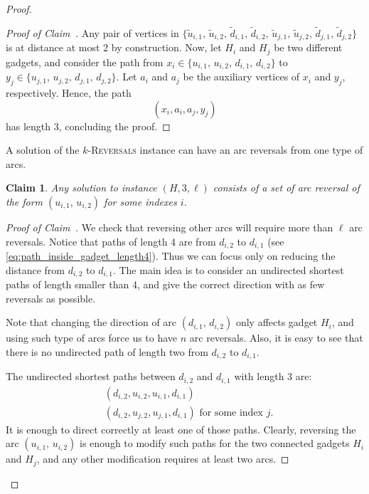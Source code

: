 \documentclass[11pt, twoside]{article}
\numberwithin{equation}{section}
\numberwithin{table}{section}
\numberwithin{figure}{section}
\newtheorem{Claim}[theorem]{Claim}
\theoremstyle{definition}
\theoremstyle{definition}
\theoremstyle{definition}
\newenvironment{claimproof}{%
  \begin{proof}[Proof of Claim~\theClaim]%
  \renewcommand{\qedsymbol}{$\lhd$}%
}{%
	\end{proof}%
}
\newcommand{\tu}[1]{\widetilde{u}_{#1}}
\newcommand{\td}[1]{\widetilde{d}_{#1}}
\begin{document}
\begin{appendices}
\begin{proof}
\begin{claimproof}
    Any pair of vertices in $\{ \tu{i,1}, \, \tu{i,2}, \, \td{i,1}, \, \td{i,2}, \, \tu{j,1}, \, \tu{j,2}, \, \td{j,1}, \, \td{j,2} \}$ is at distance at most 2 by construction. 
     Now, let $H_i$ and $H_j$ be two different gadgets, and consider the path from $x_i \in \{ u_{i,1}, \, u_{i,2}, \, d_{i,1}, \, d_{i,2}\}$ to $y_j \in \{ u_{j,1}, \,  u_{j,2}, \, d_{j,1}, \, d_{j,2}\}$. Let $a_{i}$ and $a_j$ be the auxiliary vertices of $x_i$ and $y_j$, respectively. Hence, the path
    \begin{equation}
        (x_i, a_i, a_j, y_j) \label{eq:path_between_gadgets}
    \end{equation}
    has length 3, concluding the proof. 
\end{claimproof}

A solution of the \textsc{$k$-Reversals} instance can have an arc reversals from one type of arcs.
\begin{Claim}
\label{claim:characteristic_solution_flippling}
    Any solution to instance $(H, 3, \ell)$ consists of a set of arc reversal of the form $(u_{i,1}, \,  u_{i,2})$ for some indexes $i$.
\end{Claim}
\begin{claimproof}
    We check that reversing other arcs will require more than $\ell$ arc reversals.
    Notice that paths of length 4 are from $d_{i,2}$ to $d_{i,1}$ (see \cref{eq:path_inside_gadget_length4}). Thus we can focus only on reducing the distance from $d_{i,2}$ to $d_{i,1}$. The main idea is to consider an undirected shortest paths of length smaller than 4, and give the correct direction with as few reversals as possible.

    Note that changing the direction of arc $(d_{i,1}, \, d_{i,2})$ only affects gadget $H_i$, and using such type of arcs force us to have $n$ arc reversals. Also, it is easy to see that there is no undirected path of length two from $d_{i,2}$ to $d_{i,1}$.
    
    The undirected shortest paths between $d_{i,2}$ and $d_{i,1}$ with length 3 are:
    \begin{align}
        &(d_{i,2},u_{i,2}, u_{i,1}, d_{i,1}) \label{eq:undirected_path_between_downVertices1}\\
        &(d_{i,2},u_{j,2}, u_{j,1}, d_{i,1}) \label{eq:undirected_path_between_downVertices2} \text{ for some index $j$}.
    \end{align}
    It is enough to direct correctly at least one of those paths. Clearly, reversing the arc $(u_{i,1}, \, u_{i,2})$ is enough to modify such paths for the two connected gadgets $H_i$ and $H_j$, and any other modification requires at least two arcs.


\end{claimproof}
\end{proof}
\end{appendices}
\end{document}
